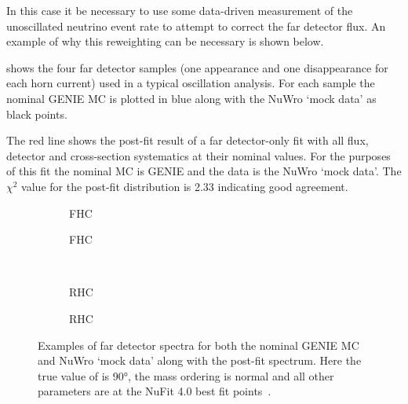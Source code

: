 In this case it be necessary to use some data-driven measurement of the unoscillated neutrino event rate to attempt to correct the far detector flux.
An example of why this reweighting can be necessary is shown below. 

 shows the four far detector samples (one appearance and one disappearance for each horn current) used in a typical oscillation analysis.
For each sample the nominal GENIE MC is plotted in blue along with the NuWro `mock data' as black points.

The red line shows the post-fit result of a far detector-only fit with all flux, detector and cross-section systematics at their nominal values. 
For the purposes of this fit the nominal MC is GENIE and the data is the NuWro `mock data'.
The $\chi^{2}$ value for the post-fit distribution is 2.33 indicating good agreement.

\begin{figure}[h]
	\begin{subfigure}[t]{0.5\linewidth}
		\begin{adjustbox}{max totalsize=\linewidth, center}
			
		\end{adjustbox}	
		\caption{\numu FHC}	
	\end{subfigure}	
	\hfill
	\begin{subfigure}[t]{0.5\linewidth}
		\begin{adjustbox}{max totalsize=\linewidth, center}
			
		\end{adjustbox}	
		\caption{\nue FHC}	
	\end{subfigure} \\ 
	\begin{subfigure}[t]{0.5\linewidth}
		\begin{adjustbox}{max totalsize=\linewidth, center}
			
		\end{adjustbox}	
		\caption{\numu RHC}	
	\end{subfigure}	
	\hfill
	\begin{subfigure}[t]{0.5\linewidth}
		\begin{adjustbox}{max totalsize=\linewidth, center}
			
		\end{adjustbox}		
		\caption{\nue RHC}
	\end{subfigure}
	\caption[Examples of far detector spectra for both the nominal GENIE MC and NuWro `mock data' along with the post-fit spectrum]{Examples of far detector spectra for both the nominal GENIE MC and NuWro `mock data' along with the post-fit spectrum. Here the true value of \dcp is \ang{90}, the mass ordering is normal and all other parameters are at the NuFit 4.0 best fit points~\cite{nufit4}.}
	\label{fig:fdSamplesPostFit}
\end{figure}

